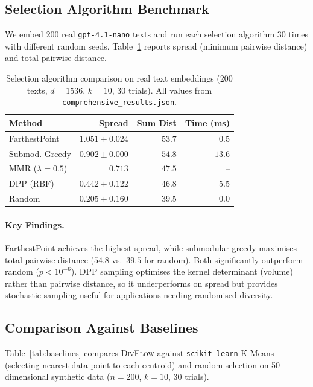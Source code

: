 \documentclass[11pt]{article}
\begin{document}
\subsection{Selection Algorithm Benchmark}
\label{sec:benchmark}

We embed 200 real \texttt{gpt-4.1-nano} texts and run each selection
algorithm 30 times with different random seeds. Table~\ref{tab:benchmark}
reports spread (minimum pairwise distance) and total pairwise distance.

\begin{table}[t]
\centering
\small
\caption{Selection algorithm comparison on real text embeddings
(200 texts, $d=1536$, $k=10$, 30 trials).
All values from \texttt{comprehensive\_results.json}.}
\label{tab:benchmark}
\begin{tabular}{lrrr}
\toprule
Method & Spread & Sum Dist & Time (ms) \\
\midrule
FarthestPoint & $\mathbf{1.051 \pm 0.024}$ & $53.7$ & $0.5$ \\
Submod. Greedy & $0.902 \pm 0.000$ & $\mathbf{54.8}$ & $13.6$ \\
MMR ($\lambda\!=\!0.5$) & $0.713$ & $47.5$ & -- \\
DPP (RBF) & $0.442 \pm 0.122$ & $46.8$ & $5.5$ \\
Random & $0.205 \pm 0.160$ & $39.5$ & $0.0$ \\
\bottomrule
\end{tabular}
\end{table}

\paragraph{Key Findings.}
FarthestPoint achieves the highest spread, while submodular greedy
maximises total pairwise distance ($54.8$ vs.\ $39.5$ for random).
Both significantly outperform random ($p < 10^{-6}$).
DPP sampling optimises the kernel determinant (volume) rather than
pairwise distance, so it underperforms on spread but provides
stochastic sampling useful for applications needing randomised diversity.

\subsection{Comparison Against Baselines}

Table~\ref{tab:baselines} compares \textsc{DivFlow} against
\texttt{scikit-learn} K-Means (selecting nearest data point to
each centroid) and random selection on 50-dimensional synthetic
data ($n=200$, $k=10$, 30 trials).
\end{document}
